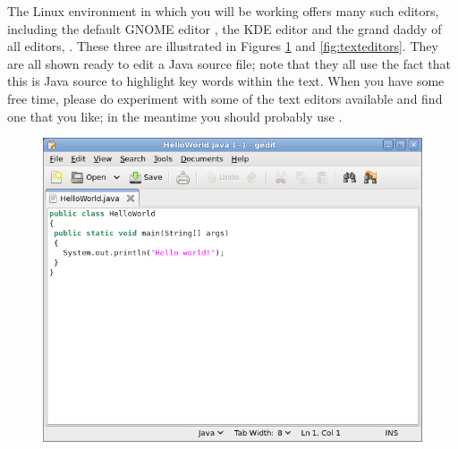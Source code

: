 The Linux environment in which you will be working offers many such
editors, including the default GNOME editor , the KDE
editor  and the grand daddy of all editors,
. These three are illustrated in Figures \ref{fig:gedit}
and \ref{fig:texteditors}. They are all shown ready to edit a
Java source file; note that they all use the fact that this is
Java source to highlight key words within the text. When you
have some free time, please do experiment with some of the text
editors available and find one that you like; in the meantime you
should probably use .

\begin{figure}
  \centering
\includegraphics[width=.7\textwidth]{images/gedit}
  \caption{}
  \label{fig:gedit}
\end{figure}

